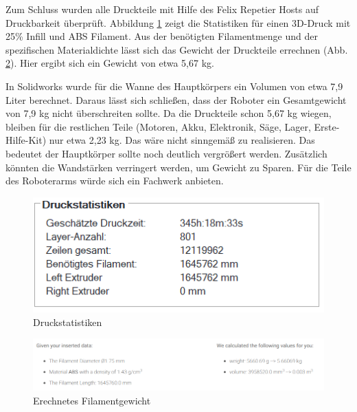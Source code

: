Zum Schluss wurden alle Druckteile mit Hilfe des Felix Repetier Hosts auf Druckbarkeit überprüft. Abbildung \ref{fig:print_stats} zeigt die Statistiken für einen 3D-Druck mit 25\% Infill  und ABS Filament. Aus der benötigten Filamentmenge und der spezifischen Materialdichte lässt sich das Gewicht der Druckteile errechnen (Abb. \ref{fig:filament_weight}). Hier ergibt sich ein Gewicht von etwa 5,67 kg.

In Solidworks wurde für die Wanne des Hauptkörpers ein Volumen von etwa 7,9 Liter berechnet. Daraus lässt sich schließen, dass der Roboter ein Gesamtgewicht von 7,9 kg nicht überschreiten sollte. Da die Druckteile schon 5,67 kg  wiegen, bleiben für die restlichen Teile (Motoren, Akku, Elektronik, Säge, Lager, Erste-Hilfe-Kit) nur etwa 2,23 kg.
Das wäre nicht sinngemäß zu realisieren. Das bedeutet der Hauptkörper sollte noch deutlich vergrößert werden. Zusätzlich könnten die Wandstärken verringert werden, um Gewicht zu Sparen. Für die Teile des Roboterarms würde sich ein Fachwerk anbieten. 
\begin{figure}[h]
    \centering
    \captionsetup{width=.9\linewidth}
    \includegraphics[width=1\linewidth]{print-statistic.PNG}
    \caption{Druckstatistiken}
    \label{fig:print_stats}
\end{figure}
\begin{figure}[h]
    \centering
    \captionsetup{width=.9\linewidth}
    \includegraphics[width=1\linewidth]{filament_weight.PNG}
    \caption{Erechnetes Filamentgewicht}
    \label{fig:filament_weight}
\end{figure}
